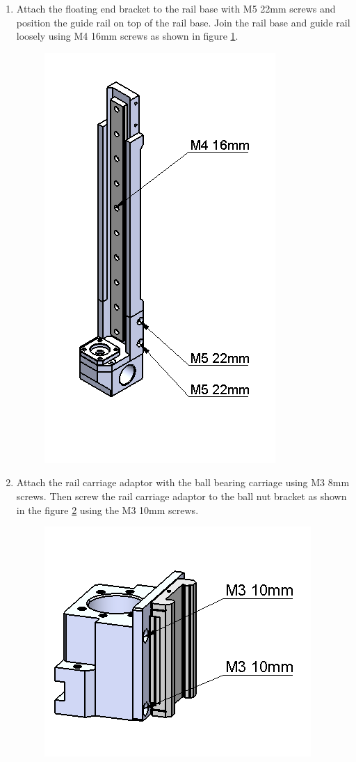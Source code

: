 \begin{enumerate}
\item Attach the floating end bracket to the rail base with M5 22mm screws and position the guide rail on top of the rail base. Join the rail base and guide rail loosely using M4 16mm screws as shown in figure \ref{fig:yaxis5}.

\begin{figure}
    \centering
    \includegraphics[scale=0.5]{Platforms/figs/yaxis5.png}
    \caption{\label{fig:yaxis5}}
\end{figure}

\item Attach the rail carriage adaptor with the ball bearing carriage using M3 8mm screws. Then screw the rail carriage adaptor to the ball nut bracket as shown in the figure \ref{fig:yaxis6} using the M3 10mm screws.

\begin{figure}
    \centering
    \includegraphics[scale=0.6]{Platforms/figs/yaxis6.png}
    \caption{\label{fig:yaxis6}}
\end{figure}


\end{enumerate}
